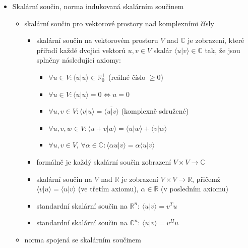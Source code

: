 \begin{itemize}
\begin{itemize}
\item vektorové prostory jsou isomorfní, pokud mezi nimi existuje isomorfismus, tedy bijektivní (vzájemně jednoznačné) lineární zobrazení
\item pro isomorfismus $f$ platí, že existuje $f^{-1}$ a je také isomorfismem
\item isomorfní prostory mají shodné dimenze
\item věta: $f$ je isomorfismus, právě když $[f]_{X,Y}$ je regulární
\end{itemize}
\item Skalární součin, norma indukovaná skalárním součinem
\begin{itemize}
\item skalární součin pro vektorové prostory nad komplexními čísly
\begin{itemize}
\item skalární součin na vektorovém prostoru $V$ nad $\mathbb C$ je zobrazení, které přiřadí každé dvojici vektorů $u,v\in V$ skalár $\langle u|v\rangle\in\mathbb C$ tak, že jsou splněny následující axiomy:
\begin{itemize}
\item $\forall u\in V:\langle u|u\rangle\in\mathbb R^+_0$ (reálné číslo $\geq 0$)
\item $\forall u\in V:\langle u|u\rangle=0\iff u=0$
\item $\forall u,v\in V: \langle v|u\rangle=\overline{\langle u|v\rangle}$ (komplexně sdružené)
\item $\forall u,v,w \in V: \langle u+v|w\rangle=\langle u|w\rangle+\langle v|w\rangle$
\item $\forall u,v\in V,\,\forall \alpha\in\mathbb C: \langle \alpha u|v\rangle=\alpha\langle u|v\rangle$
\end{itemize}
\item formálně je každý skalární součin zobrazení $V\times V\to\mathbb C$
\item skalární součin na $V$ nad $\mathbb R$ je zobrazení $V\times V\to\mathbb R$, přičemž $\langle v|u\rangle = \langle u|v\rangle$ (ve třetím axiomu), $\alpha\in\mathbb R$ (v posledním axiomu)
\item standardní skalární součin na $\mathbb R^n$: $\langle u|v\rangle=v^Tu$
\item standardní skalární součin na $\mathbb C^n$: $\langle u|v\rangle=v^Hu$
\end{itemize}
\item norma spojená se skalárním součinem
\begin{itemize}

\end{itemize}
\end{itemize}
\end{itemize}
